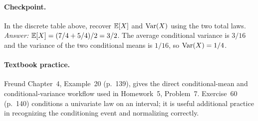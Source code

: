 \paragraph{Checkpoint.} In the discrete table above, recover $\mathbb E[X]$ and $\operatorname{Var}(X)$ using the two total laws. \emph{Answer:} $\mathbb E[X]=(7/4+5/4)/2=3/2$. The average conditional variance is $3/16$ and the variance of the two conditional means is $1/16$, so $\operatorname{Var}(X)=1/4$.

\paragraph{Textbook practice.} Freund Chapter~4, Example~20 (p.~139), gives the direct conditional-mean and conditional-variance workflow used in Homework~5, Problem~7. Exercise~60 (p.~140) conditions a univariate law on an interval; it is useful additional practice in recognizing the conditioning event and normalizing correctly.

